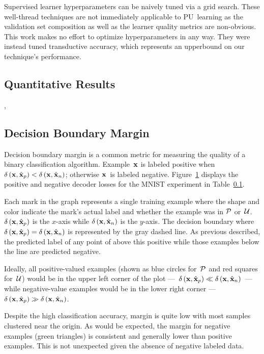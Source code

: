 Supervised learner hyperparameters can be naively tuned via a grid search.  These well-thread techniques are not immediately applicable to PU~learning as the validation set composition as well as the learner quality metrics are non-obvious.  This work makes no effort to optimize hyperparameters in any way.  They were instead tuned transductive accuracy, which represents an upperbound on our technique's performance.

\subsection{Quantitative Results}

\toolname,

\subsection{Decision Boundary Margin}\label{sec:Experiments:Margin}

Decision boundary margin is a common metric for measuring the quality of a binary classification algorithm. Example~$\mathbf{x}$ is labeled positive when ${\delta\left(\mathbf{x}, \hat{\mathbf{x}}_{p}\right)<\delta\left(\mathbf{x}, \hat{\mathbf{x}}_{n}\right)}$; otherwise $\mathbf{x}$~is labeled negative. Figure~\ref{fig:Experiments:UnlabelPlot} displays the positive and negative decoder losses for the MNIST experiment in Table~\ref{}.

Each mark in the graph represents a single training example where the shape and color indicate the mark's actual label and whether the example was in $\mathcal{P}$ or~$\mathcal{U}$. $\delta\left(\mathbf{x}, \hat{\mathbf{x}}_{p}\right)$ is the $x$-axis while $\delta\left(\mathbf{x}, \hat{\mathbf{x}}_{n}\right)$ is the $y$-axis. The decision boundary where ${\delta\left(\mathbf{x}, \hat{\mathbf{x}}_{p}\right)=\delta\left(\mathbf{x}, \hat{\mathbf{x}}_{n}\right)}$ is represented by the gray dashed line.  As previous described, the predicted label of any point of above this positive while those examples below the line are predicted negative.

Ideally, all positive-valued examples (shown as blue circles for~$\mathcal{P}$ and red squares for~$\mathcal{U}$) would be in the upper left corner of the plot ---~${\delta\left(\mathbf{x}, \hat{\mathbf{x}}_{p}\right)\ll\delta\left(\mathbf{x}, \hat{\mathbf{x}}_{n}\right)}$~--- while negative-value examples would be in the lower right corner ---~${\delta\left(\mathbf{x}, \hat{\mathbf{x}}_{p}\right)\gg\delta\left(\mathbf{x}, \hat{\mathbf{x}}_{n}\right)}$.

\begin{figure}[t]
  \centering
  \caption{}\label{fig:Experiments:UnlabelPlot}
\end{figure}

Despite the high classification accuracy, margin is quite low with most samples clustered near the origin.  As would be expected, the margin for negative examples (green triangles) is consistent and generally lower than positive examples.  This is not unexpected given the absence of negative labeled data.
